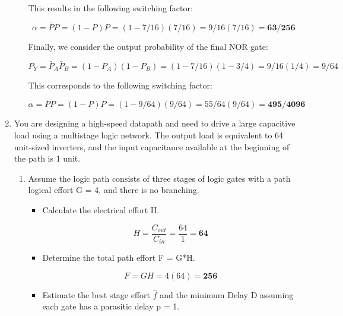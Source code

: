 \documentclass[fleqn]{article}
\begin{document}
\begin{enumerate}
\begin{enumerate}
			This results in the following switching factor:
			
			\begin{equation*}
				\alpha = \bar{P}P = (1 - P)P = (1 - 7/16)(7/16) = 9/16(7/16) = \mathbf{63/256}
			\end{equation*}
			
			Finally, we consider the output probability of the final NOR gate:
			
			\begin{equation*}
				P_Y = \bar{P}_A\bar{P}_B = (1 - P_A)(1 - P_B) = (1 - 7/16)(1 - 3/4) = 9/16(1/4) = 9/64
			\end{equation*}
			
			This corresponds to the following switching factor:
			
			\begin{equation*}
				\alpha = \bar{P}P = (1 - P)P = (1 - 9/64)(9/64) = 55/64(9/64) = \mathbf{495/4096}
			\end{equation*}
			
		\end{enumerate}

		\item You are designing a high-speed datapath and need to drive a large capacitive load using a multistage logic network. The output load is equivalent to 64 unit-sized inverters, and the input capacitance available at the beginning of the path is 1 unit.
			
		\begin{enumerate}
			\item Assume the logic path consists of three stages of logic gates with a path logical effort G = 4, and there is no branching.
				
			\begin{itemize}
				\item Calculate the electrical effort H.
					
				\begin{equation*}
					H = \frac{C_{out}}{C_{in}} = \frac{64}{1} = \mathbf{64}
				\end{equation*}
					
				\item Determine the total path effort F = G*H.
					
				\begin{equation*}
					F = GH = 4(64) = \mathbf{256}
				\end{equation*}
					
				\item Estimate the best stage effort $\hat{f}$ and the minimum Delay D assuming each gate has a parasitic delay p = 1.
					

\end{itemize}
\end{enumerate}
\end{enumerate}
\end{document}
